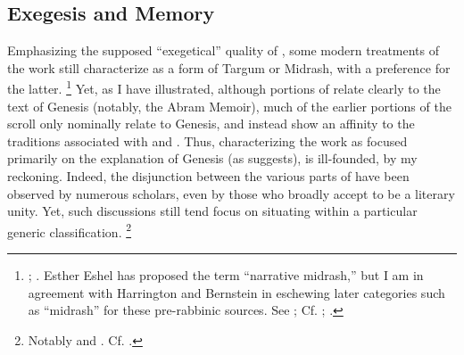 \subsection{Exegesis and Memory}
Emphasizing the supposed ``exegetical'' quality of \ga, some modern treatments of the work still characterize \ga as a form of Targum or Midrash, with a preference for the latter.%
    \footnote{\Cite{evans_revq1988}; \cite[19]{fitzmyer2004}. Esther Eshel has proposed the term ``narrative midrash,'' but I am in agreement with Harrington and Bernstein in eschewing later categories such as ``midrash'' for these pre-rabbinic sources. See \cite[182]{eshel_roitman-etal2011}; Cf. \cite[242]{harrington_kraft-nickelsburg1986}; \cite[327 n. 33; 328--329]{bernstein_berthelot-etal2010}.}
Yet, as I have illustrated, although portions of \ga relate clearly to the text of Genesis (notably, the Abram Memoir), much of the earlier portions of the scroll only nominally relate to Genesis, and instead show an affinity to the traditions associated with \firstenoch and \jub. Thus, characterizing the work as focused primarily on the explanation of Genesis (as \vermes suggests), is ill-founded, by my reckoning. Indeed, the disjunction between the various parts of \ga have been observed by numerous scholars, even by those who broadly accept \ga to be a literary unity. Yet, such discussions still tend focus on situating \ga within a particular generic classification.%
    \footnote{Notably \cite{bernstein_as2010} and \cite{falk2007}. Cf. \cite{eshel_roitman-etal2011}.}

